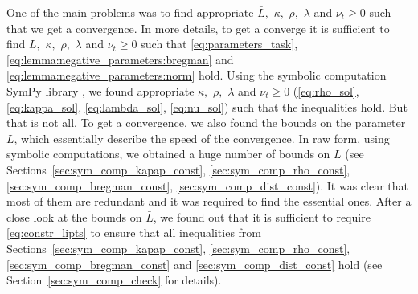 \documentclass{article} %
\theoremstyle{plain}
\theoremstyle{definition}
\theoremstyle{remark}
\begin{document}
One of the main problems was to find appropriate $\bar{L},$ $\kappa,$ $\rho,$ $\lambda$ and $\nu_{t} \geq 0$ such that we get a convergence. In more details, to get a converge it is sufficient to find $\bar{L},$ $\kappa,$ $\rho,$ $\lambda$ and $\nu_{t} \geq 0$ such that \eqref{eq:parameters_task}, \eqref{eq:lemma:negative_parameters:bregman} and \eqref{eq:lemma:negative_parameters:norm} hold. Using the symbolic computation SymPy library \citep{sympy}, we found appropriate $\kappa,$ $\rho,$ $\lambda$ and $\nu_{t} \geq 0$ (\eqref{eq:rho_sol}, \eqref{eq:kappa_sol}, \eqref{eq:lambda_sol}, \eqref{eq:nu_sol}) such that the inequalities hold. But that is not all. To get a convergence, we also found the bounds on the parameter $\bar{L}$, which essentially describe the speed of the convergence. In raw form, using symbolic computations, we obtained a huge number of bounds on $\bar{L}$ (see Sections~\ref{sec:sym_comp_kapap_const}, \ref{sec:sym_comp_rho_const}, \ref{sec:sym_comp_bregman_const}, \ref{sec:sym_comp_dist_const}). It was clear that most of them are redundant and it was required to find the essential ones. After a close look at the bounds on $\bar{L}$, we found out that it is sufficient to require \eqref{eq:constr_lipts} to ensure that all inequalities from Sections~\ref{sec:sym_comp_kapap_const}, \ref{sec:sym_comp_rho_const}, \ref{sec:sym_comp_bregman_const} and \ref{sec:sym_comp_dist_const} hold (see Section~\ref{sec:sym_comp_check} for details).
\end{document}
